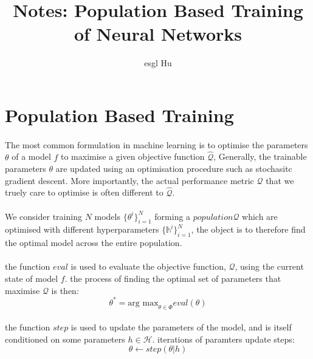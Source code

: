 \documentclass[12pt,a4paper]{article}
\begin{document}
\title{Notes: Population Based Training of Neural Networks\cite{Jaderberg2017Population}}
\author{esgl Hu}
\maketitle
\section{Population Based Training}
\paragraph{}The most common formulation in machine learning is to optimise the parameters $\theta$ of a model $f$ to maximise a given objective function $\hat{\mathcal{Q}}$, Generally, the trainable parameters $\theta$ are updated using an optimisation procedure such as stochasitc gradient descent. More importantly, the actual performance metric $\mathcal{Q}$ that we truely care to optimise is often different to $\hat{\mathcal{Q}}$.

\paragraph{} We consider training $N$ models $\{\theta^{i}\}_{i=1}^{N}$ forming a $population \mathcal{Q}$ which are optimised with different hyperparameters $\{\mathbb{h}^{i}\}_{i=1}^{N}$, the object is to therefore find the optimal model across the entire population.

\paragraph{} the function \underline{$\mathit{eval}$} is used to evaluate the objective function, $\mathcal{Q}$, using the current state of model $f$.
the process of finding the optimal set of parameters that maximise $\mathcal{Q}$ is then:
\begin{equation}\label{arg_max_eval_theta}
	\theta^{*} = \text{arg max}_{\theta \in \Phi} \mathit{eval}(\theta)
\end{equation}

\paragraph{} the function \underline{$\mathit{step}$} is used to update the parameters of the model, and is itself conditioned on some parameters $h \in \mathcal{H}$. iterations of paramters update steps:
\begin{equation}\label{step_function}
	\theta \leftarrow \mathit{step}(\theta|h)
\end{equation}
\end{document}
